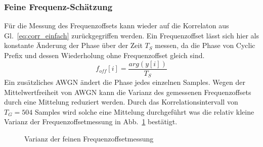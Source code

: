 \subsubsection{Feine Frequenz-Schätzung}
Für die Messung des Frequenzoffsets kann wieder auf die Korrelaton aus Gl.~\ref{eq:corr_einfach} zurückgegriffen werden. Ein Frequenzoffset lässt sich hier als konstante Änderung der Phase über der Zeit $T_S$ messen, da die Phase von Cyclic Prefix und dessen Wiederholung ohne Frequenzoffset gleich sind. 
\begin{equation}
f_{off}[i] = \frac{arg(y[i])}{T_S}
\label{eq:fine_frequency_estimation}
\end{equation}
Ein zusätzliches \ac{AWGN} ändert die Phase jedes einzelnen Samples. Wegen der Mittelwertfreiheit von \ac{AWGN} kann die Varianz des gemessenen Frequenzoffsets durch eine Mittelung reduziert werden.
Durch das Korrelationsintervall von $T_G = 504$ Samples wird solche eine Mittelung durchgeführt was die relativ kleine Varianz der Frequenzoffsetmessung in Abb.~\ref{plot:varianz_freq_offset} bestätigt.
\begin{figure}
\begin{center}
\end{center}
\label{plot:varianz_freq_offset}
\caption{Varianz der feinen Frequenzoffsetmessung}
\end{figure}

